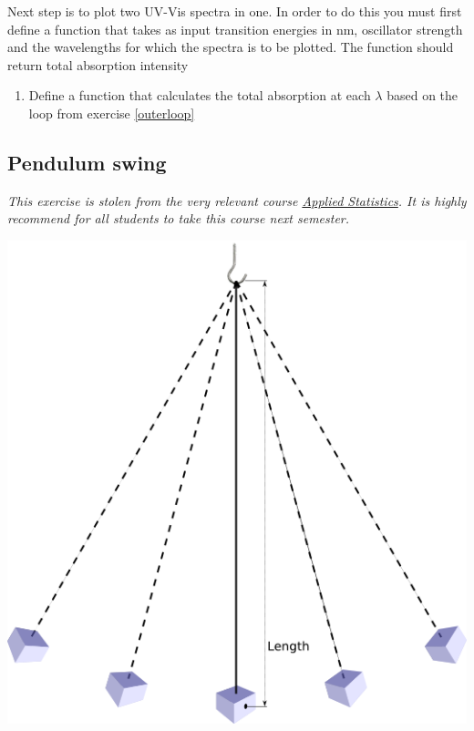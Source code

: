 \documentclass{article}
\begin{document}
Next step is to plot two UV-Vis spectra in one. In order to do this you  must first define a function that takes as input transition energies in nm, oscillator strength and the wavelengths for which the spectra is to be plotted. The function should return total absorption intensity

\begin{enumerate}[resume]
\item Define a function that calculates the total absorption at each $\lambda$ based on the loop from exercise \ref{outerloop}
\end{enumerate}


\newpage
\subsection{Pendulum swing}

{
    \em
    This exercise is stolen from the very relevant course \href{http://kurser.ku.dk/course/nfyk13011u/2016-2017}{Applied Statistics}.
    It is highly recommend for all students to take this course next semester.
}\\

\begin{center}
\includegraphics[scale=0.4]{images/week5_pendulum.png}
\end{center}
\end{document}
